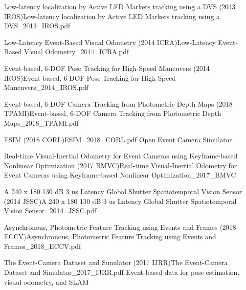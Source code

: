 \documentclass[10pt,a4paper]{scrartcl}
\begin{document}
\begin{multicols*}{2}
\begin{Paper}{Low-latency localization by Active LED Markers tracking using a DVS (2013 IROS)}{Low-latency localization by Active LED Markers tracking using a DVS_2013_IROS.pdf}
\end{Paper}

\begin{Paper}{Low-Latency Event-Based Visual Odometry (2014 ICRA)}{Low-Latency Event-Based Visual Odometry_2014_ICRA.pdf}
\end{Paper}

\begin{Paper}{Event-based, 6-DOF Pose Tracking for High-Speed Maneuvers (2014 IROS)}{Event-based, 6-DOF Pose Tracking for High-Speed Maneuvers_2014_IROS.pdf}
\end{Paper}

\begin{Paper}{Event-based, 6-DOF Camera Tracking from Photometric Depth Maps (2018 TPAMI)}{Event-based, 6-DOF Camera Tracking from Photometric Depth Maps_2018_TPAMI.pdf}
\end{Paper}

\begin{Paper}{ESIM (2018 CORL)}{ESIM_2018_CORL.pdf}
Open Event Camera Simulator
\end{Paper}

\begin{Paper}{Real-time Visual-Inertial Odometry for Event Cameras using Keyframe-based Nonlinear Optimization (2017 BMVC)}{Real-time Visual-Inertial Odometry for Event Cameras using Keyframe-based Nonlinear Optimization_2017_BMVC}
\end{Paper}

\begin{Paper}{A 240 x 180 130 dB 3 us Latency Global Shutter Spatiotemporal Vision Sensor (2014 JSSC)}{A 240 x 180 130 dB 3 us Latency Global Shutter Spatiotemporal Vision Sensor_2014_JSSC.pdf}
\end{Paper}

\begin{Paper}{Asynchronous, Photometric Feature Tracking using Events and Frames (2018 ECCV)}{Asynchronous, Photometric Feature Tracking using Events and Frames_2018_ECCV.pdf}
\end{Paper}

\begin{Paper}{The Event-Camera Dataset and Simulator (2017 IJRR)}{The Event-Camera Dataset and Simulator_2017_IJRR.pdf}
Event-based data for pose estimation, visual odometry, and SLAM
\end{Paper}


\end{multicols*}
\end{document}
